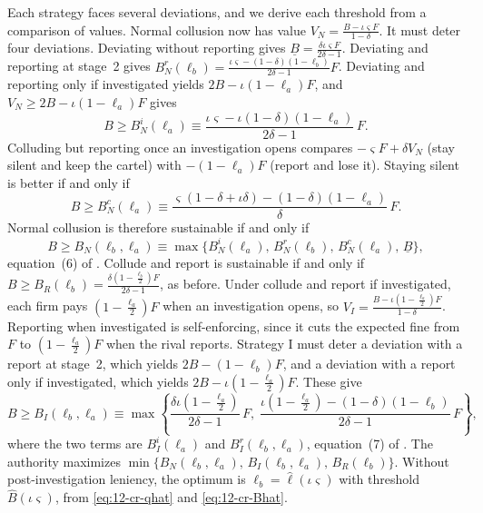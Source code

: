 Each strategy faces several deviations, and we derive each threshold from a comparison of values. Normal collusion now
has value $V_N = \frac{B - \iota\varsigma F}{1-\delta}$. It must deter four deviations. Deviating without reporting
gives $\underline B = \frac{\delta\iota\varsigma F}{2\delta - 1}$. Deviating and reporting at stage~2 gives
$B_N^r(\ell_b) = \frac{\iota\varsigma - (1-\delta)(1-\ell_b)}{2\delta - 1}F$. Deviating and reporting only if
investigated yields $2B - \iota(1-\ell_a)F$, and $V_N \ge 2B - \iota(1-\ell_a)F$ gives
\begin{equation*}
B \ge B_N^i(\ell_a) \equiv \frac{\iota\varsigma - \iota(1-\delta)(1-\ell_a)}{2\delta - 1}\,F.
\end{equation*}
Colluding but reporting once an investigation opens compares $-\varsigma F + \delta V_N$ (stay silent and keep the
cartel) with $-(1-\ell_a)F$ (report and lose it). Staying silent is better if and only if
\begin{equation*}
B \ge B_N^c(\ell_a) \equiv \frac{\varsigma(1 - \delta + \iota\delta) - (1-\delta)(1-\ell_a)}{\delta}\,F.
\end{equation*}
Normal collusion is therefore sustainable if and only if
\begin{equation}\label{eq:12-cr-open-N}
B \ge B_N(\ell_b, \ell_a) \equiv \max\{B_N^i(\ell_a),\, B_N^r(\ell_b),\, B_N^c(\ell_a),\, \underline B\},
\end{equation}
equation~(6) of \citet{ChenRey2013}. Collude and report is sustainable if and only if
$B \ge B_R(\ell_b) = \frac{\delta(1 - \frac{\ell_b}{2})F}{2\delta-1}$, as before. Under collude and report if
investigated, each firm pays $(1 - \frac{\ell_a}{2})F$ when an investigation opens, so
$V_I = \frac{B - \iota(1 - \frac{\ell_a}{2})F}{1-\delta}$. Reporting when investigated is self-enforcing, since it cuts
the expected fine from $F$ to $(1 - \frac{\ell_a}{2})F$ when the rival reports. Strategy I must deter a deviation with
a report at stage~2, which yields $2B - (1-\ell_b)F$, and a deviation with a report only if investigated, which yields
$2B - \iota(1 - \frac{\ell_a}{2})F$. These give
\begin{equation}\label{eq:12-cr-open-I}
B \ge B_I(\ell_b, \ell_a) \equiv \max\left\{
\frac{\delta\iota\left(1 - \frac{\ell_a}{2}\right)}{2\delta - 1}\,F,\;
\frac{\iota\left(1 - \frac{\ell_a}{2}\right) - (1-\delta)(1-\ell_b)}{2\delta - 1}\,F\right\},
\end{equation}
where the two terms are $B_I^i(\ell_a)$ and $B_I^r(\ell_b, \ell_a)$, equation~(7) of \citet{ChenRey2013}. The
authority maximizes $\min\{B_N(\ell_b,\ell_a),\, B_I(\ell_b,\ell_a),\, B_R(\ell_b)\}$. Without post-investigation
leniency, the optimum is $\ell_b = \hat\ell(\iota\varsigma)$ with threshold $\hat B(\iota\varsigma)$, from
\eqref{eq:12-cr-qhat} and \eqref{eq:12-cr-Bhat}.

